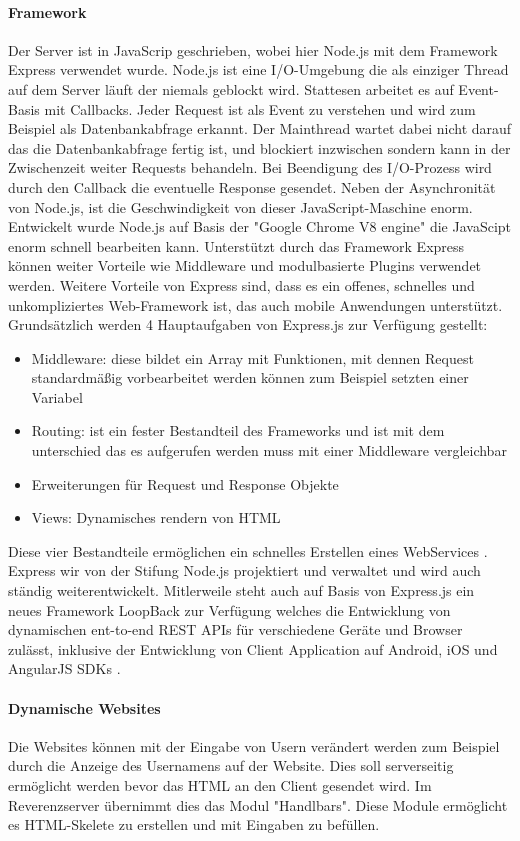 \paragraph{Framework}
Der Server ist in JavaScrip geschrieben, wobei hier Node.js mit dem Framework Express verwendet wurde. Node.js ist eine I/O-Umgebung die als einziger Thread auf dem Server läuft der niemals geblockt wird. Stattesen arbeitet es auf Event-Basis mit Callbacks. Jeder Request ist als Event zu verstehen und wird zum Beispiel als Datenbankabfrage erkannt. Der Mainthread wartet dabei nicht darauf das die Datenbankabfrage fertig ist, und blockiert inzwischen sondern kann in der Zwischenzeit weiter Requests behandeln. Bei Beendigung des I/O-Prozess wird durch den Callback die eventuelle Response gesendet. Neben der Asynchronität von Node.js, ist die Geschwindigkeit von dieser JavaScript-Maschine enorm. Entwickelt wurde Node.js auf Basis der "Google Chrome V8 engine" die JavaScipt enorm schnell bearbeiten kann. Unterstützt durch das Framework Express können weiter Vorteile wie Middleware und modulbasierte Plugins verwendet werden. Weitere Vorteile von Express sind, dass es ein offenes, schnelles und unkompliziertes Web-Framework ist, das auch mobile Anwendungen unterstützt. Grundsätzlich werden 4 Hauptaufgaben von Express.js zur Verfügung gestellt:
\begin{itemize}
	\item Middleware: diese bildet ein Array mit Funktionen, mit dennen Request standardmäßig vorbearbeitet werden können zum Beispiel setzten einer Variabel
	\item Routing: ist ein fester Bestandteil des Frameworks und ist mit dem unterschied das es aufgerufen werden muss mit einer Middleware vergleichbar
	\item Erweiterungen für Request und Response Objekte
	\item Views: Dynamisches rendern von HTML
\end {itemize} 
Diese vier Bestandteile ermöglichen ein schnelles Erstellen eines WebServices \parencite{expressinaction}. 
Express wir von der Stifung Node.js projektiert und verwaltet und wird auch ständig weiterentwickelt\parencite{expressjs}. Mitlerweile steht auch auf Basis von Express.js ein neues Framework LoopBack zur Verfügung welches die Entwicklung von dynamischen ent-to-end REST APIs für verschiedene Geräte und Browser zulässt, inklusive der Entwicklung von Client Application auf Android, iOS und AngularJS SDKs \parencite{loopback}.

\paragraph{Dynamische Websites}
Die Websites können mit der Eingabe von Usern verändert werden zum Beispiel durch die Anzeige des Usernamens auf der Website. Dies soll serverseitig ermöglicht werden bevor das HTML an den Client gesendet wird. Im Reverenzserver übernimmt dies das Modul "Handlbars". Diese Module ermöglicht es HTML-Skelete zu erstellen und mit Eingaben zu befüllen.

